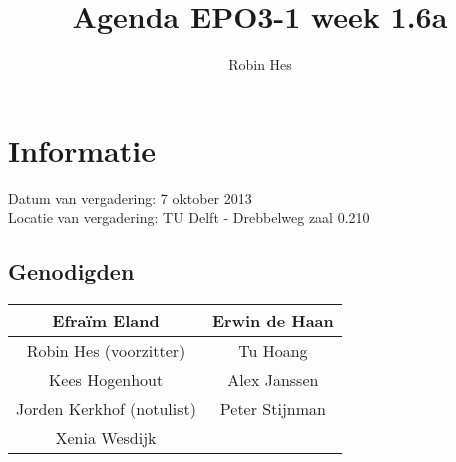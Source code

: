 \documentclass{article}
\begin{document}
\title{Agenda EPO3-1 week 1.6a}%
\author{Robin Hes}%
\maketitle

\section*{Informatie}
Datum van vergadering: 7 oktober 2013\\ %
Locatie van vergadering: TU Delft - Drebbelweg zaal 0.210 %
\subsection*{Genodigden}
\begin{center}
\begin{tabular}{|c |c |}
	\hline
	Efraïm Eland & Erwin de Haan \\
	\hline
	Robin Hes (voorzitter) & Tu Hoang \\
	\hline
	Kees Hogenhout & Alex Janssen \\
	\hline
	Jorden Kerkhof (notulist) & Peter Stijnman \\
	\hline
	Xenia Wesdijk & \\
	\hline
\end{tabular}
\end{center}
\end{document}
